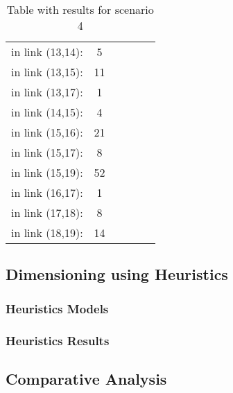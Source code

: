 \begin{table}[h!]
\begin{tabular}{|| c | c || c | c || c | c ||}
in link (13,14): & 5& & & & \\
in link (13,15): & 11& & & & \\
in link (13,17): & 1& & & & \\
in link (14,15): & 4& & & & \\
in link (15,16): & 21& & & & \\
in link (15,17): & 8& & & & \\
in link (15,19): & 52& & & & \\
in link (16,17): & 1& & & & \\
in link (17,18): & 8& & & & \\
in link (18,19): & 14& & & & \\
 \hline
\end{tabular}
\caption{Table with results for scenario 4}
\label{result_ILP4_T}
\end{table}

\newpage

\subsection{Dimensioning using Heuristics}

\subsubsection{Heuristics Models}

\subsubsection{Heuristics Results}

\subsection{Comparative Analysis} 
